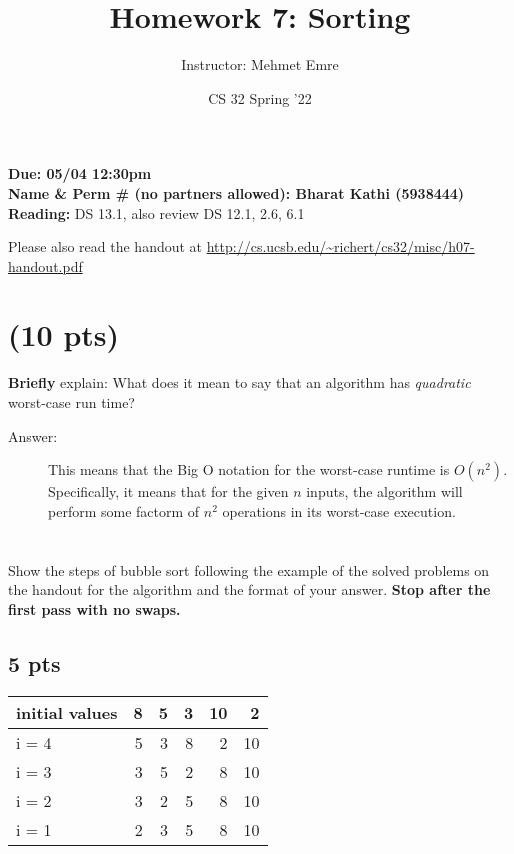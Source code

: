 \documentclass[11pt]{article}
\author{Instructor: Mehmet Emre}
\date{CS 32 Spring '22}
\title{Homework 7: Sorting}
\begin{document}
\maketitle
\textbf{Due: 05/04 12:30pm} \\ 
\vspace{1em}
\textbf{Name \& Perm \# (no partners allowed): Bharat Kathi (5938444)} \\ 
\vspace{1em}
\textbf{Reading:} DS 13.1, also review DS 12.1, 2.6, 6.1


Please also read the handout at \url{http://cs.ucsb.edu/\~richert/cs32/misc/h07-handout.pdf}

\section{(10 pts)}
\label{sec:org60740aa}
\textbf{Briefly} explain: What does it mean to say that an algorithm has \emph{quadratic}
worst-case run time?

\begin{description}
    \item[Answer:] This means that the Big O notation for the worst-case runtime is $O(n^2)$. Specifically, it means that for the given $n$ inputs, the algorithm will perform some factorm of $n^2$ operations in its worst-case execution.
\end{description}

\section{}
\label{sec:org9fa5c4e}
Show the steps of bubble sort following the example of the solved problems on
the handout for the algorithm and the format of your answer. \textbf{Stop after the
first pass with no swaps.}

\subsection{5 pts}
\label{sec:orgac34f58}

\begin{center}
\begin{tabular}{lrrrrr}
initial values & 8 & 5 & 3 & 10 & 2\\
\hline
i = 4 & 5 & 3 & 8 & 2 & 10\\
\hline
i = 3 & 3 & 5 & 2 & 8 & 10\\
\hline
i = 2 & 3 & 2 & 5 & 8 & 10\\
\hline
i = 1 & 2 & 3 & 5 & 8 & 10\\
\end{tabular}
\end{center}
\end{document}
